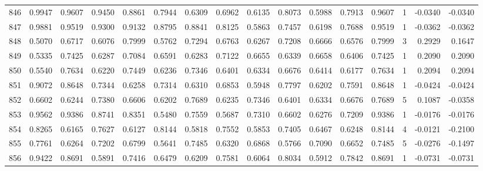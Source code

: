 \begin{tabular}{lrrrrrrrrrrrrrrr}
846 &      0.9947 &  0.9607 &  0.9450 &  0.8861 &  0.7944 &  0.6309 &  0.6962 &  0.6135 &  0.8073 &  0.5988 &   0.7913 &     0.9607 &      1 &                   -0.0340 &                    -0.0340 \\
847 &      0.9881 &  0.9519 &  0.9300 &  0.9132 &  0.8795 &  0.8841 &  0.8125 &  0.5863 &  0.7457 &  0.6198 &   0.7688 &     0.9519 &      1 &                   -0.0362 &                    -0.0362 \\
848 &      0.5070 &  0.6717 &  0.6076 &  0.7999 &  0.5762 &  0.7294 &  0.6763 &  0.6267 &  0.7208 &  0.6666 &   0.6576 &     0.7999 &      3 &                    0.2929 &                     0.1647 \\
849 &      0.5335 &  0.7425 &  0.6287 &  0.7084 &  0.6591 &  0.6283 &  0.7122 &  0.6655 &  0.6339 &  0.6658 &   0.6406 &     0.7425 &      1 &                    0.2090 &                     0.2090 \\
850 &      0.5540 &  0.7634 &  0.6220 &  0.7449 &  0.6236 &  0.7346 &  0.6401 &  0.6334 &  0.6676 &  0.6414 &   0.6177 &     0.7634 &      1 &                    0.2094 &                     0.2094 \\
851 &      0.9072 &  0.8648 &  0.7344 &  0.6258 &  0.7314 &  0.6310 &  0.6853 &  0.5948 &  0.7797 &  0.6202 &   0.7591 &     0.8648 &      1 &                   -0.0424 &                    -0.0424 \\
852 &      0.6602 &  0.6244 &  0.7380 &  0.6606 &  0.6202 &  0.7689 &  0.6235 &  0.7346 &  0.6401 &  0.6334 &   0.6676 &     0.7689 &      5 &                    0.1087 &                    -0.0358 \\
853 &      0.9562 &  0.9386 &  0.8741 &  0.8351 &  0.5480 &  0.7559 &  0.5687 &  0.7310 &  0.6602 &  0.6276 &   0.7209 &     0.9386 &      1 &                   -0.0176 &                    -0.0176 \\
854 &      0.8265 &  0.6165 &  0.7627 &  0.6127 &  0.8144 &  0.5818 &  0.7552 &  0.5853 &  0.7405 &  0.6467 &   0.6248 &     0.8144 &      4 &                   -0.0121 &                    -0.2100 \\
855 &      0.7761 &  0.6264 &  0.7202 &  0.6799 &  0.5641 &  0.7485 &  0.6320 &  0.6868 &  0.5766 &  0.7090 &   0.6652 &     0.7485 &      5 &                   -0.0276 &                    -0.1497 \\
856 &      0.9422 &  0.8691 &  0.5891 &  0.7416 &  0.6479 &  0.6209 &  0.7581 &  0.6064 &  0.8034 &  0.5912 &   0.7842 &     0.8691 &      1 &                   -0.0731 &                    -0.0731 \\

\end{tabular}
